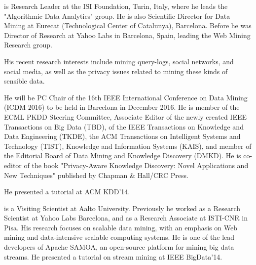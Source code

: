 \documentclass[pdfpagelabels=false]{sig-alternate-2013} %
\begin{document}
\smallskip
{} is Research Leader at the ISI Foundation, Turin, Italy,
where he leads the "Algorithmic Data Analytics" group. He is also Scientific
Director for Data Mining at Eurecat (Technological Center of Catalunya),
Barcelona. Before he was Director of Research at Yahoo Labs in Barcelona, Spain,
leading the Web Mining Research group.

His recent research interests include mining query-logs, social networks, and
social media, as well as the privacy issues related to mining these kinds of
sensible data.

He will be PC Chair of the 16th IEEE International Conference on Data Mining
(ICDM 2016) to be held in Barcelona in December 2016. He is member of the ECML
PKDD Steering Committee, Associate Editor of the newly created IEEE Transactions
on Big Data (TBD), of the IEEE Transactions on Knowledge and Data Engineering
(TKDE), the ACM Transactions on Intelligent Systems and Technology (TIST),
Knowledge and Information Systems (KAIS), and member of the Editorial Board of
Data Mining and Knowledge Discovery (DMKD).  %
He is co-editor of the book "Privacy-Aware Knowledge Discovery: Novel
Applications and New Techniques" published by Chapman \& Hall/CRC Press.

He presented a tutorial at ACM KDD'14.

\smallskip
{} is a Visiting Scientist at Aalto
University. Previously he worked as a Research Scientist at Yahoo Labs
Barcelona, and as a Research Associate at ISTI-CNR in Pisa. His research focuses
on scalable data mining, with an emphasis on Web mining and data-intensive
scalable computing systems.
He is one of the lead developers of Apache SAMOA, an open-source platform for
mining big data streams. He presented a tutorial on stream mining at IEEE
BigData'14.
\end{document}
